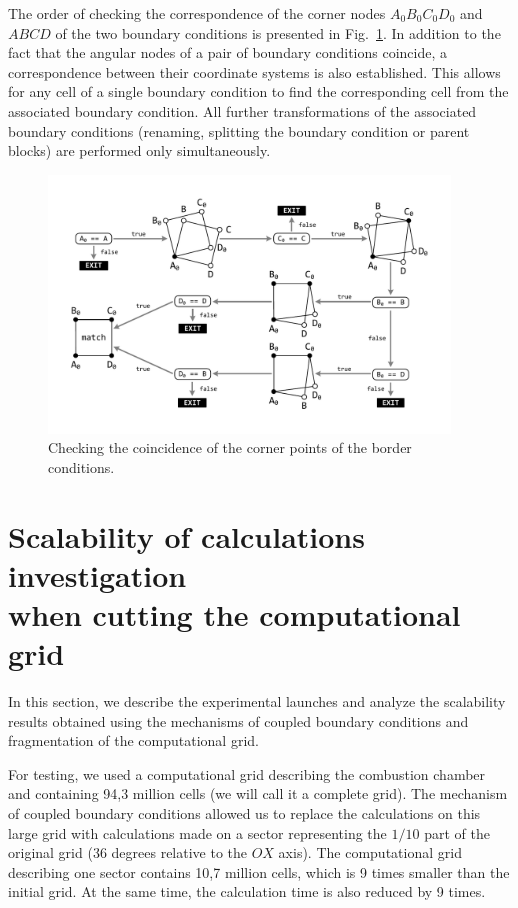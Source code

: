 \documentclass[
11pt,%
tightenlines,%
twoside,%
onecolumn,%
nofloats,%
nobibnotes,%
nofootinbib,%
superscriptaddress,%
noshowpacs,%
centertags]%
{revtex4}
\begin{document}
The order of checking the correspondence of the corner nodes $A_0B_0C_0D_0$ and $ABCD$ of the two boundary conditions is presented in Fig.~\ref{fig:match2}.
In addition to the fact that the angular nodes of a pair of boundary conditions coincide, a correspondence between their coordinate systems is also established.
This allows for any cell of a single boundary condition to find the corresponding cell from the associated boundary condition.
All further transformations of the associated boundary conditions (renaming, splitting the boundary condition or parent blocks) are performed only simultaneously.

\begin{figure}[h]
\setcaptionmargin{5mm}
\onelinecaptionstrue
\includegraphics[width=0.95\textwidth]{pics/match2.pdf}
\caption{Checking the coincidence of the corner points of the border conditions.}
\label{fig:match2}
\end{figure}

\section{Scalability of calculations investigation \protect\\ when cutting the computational grid}

In this section, we describe the experimental launches and analyze the scalability results obtained using the mechanisms of coupled boundary conditions and fragmentation of the computational grid.

For testing, we used a computational grid describing the combustion chamber and containing 94,3 million cells (we will call it a complete grid).
The mechanism of coupled boundary conditions allowed us to replace the calculations on this large grid with calculations made on a sector representing the $1/10$ part of the original grid (36 degrees relative to the $OX$ axis).
The computational grid describing one sector contains 10,7 million cells, which is 9 times smaller than the initial grid.
At the same time, the calculation time is also reduced by 9 times.
\end{document}
